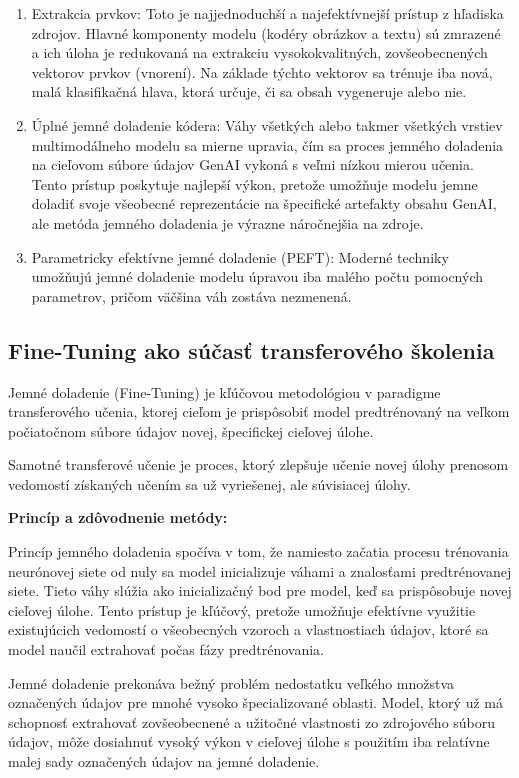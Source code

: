 \documentclass[]{tukediphc}
\begin{document}
\begin{enumerate}
    \item Extrakcia prvkov: Toto je najjednoduchší a najefektívnejší prístup z hľadiska zdrojov. Hlavné komponenty modelu (kodéry obrázkov a textu) sú zmrazené a ich úloha je redukovaná na extrakciu vysokokvalitných, zovšeobecnených vektorov prvkov (vnorení). Na základe týchto vektorov sa trénuje iba nová, malá klasifikačná hlava, ktorá určuje, či sa obsah vygeneruje alebo nie\cite{huggingface:transfer_learning}. 
    \item Úplné jemné doladenie kódera: Váhy všetkých alebo takmer všetkých vrstiev multimodálneho modelu sa mierne upravia, čím sa proces jemného doladenia na cieľovom súbore údajov GenAI vykoná s veľmi nízkou mierou učenia. Tento prístup poskytuje najlepší výkon, pretože umožňuje modelu jemne doladiť svoje všeobecné reprezentácie na špecifické artefakty obsahu GenAI, ale metóda jemného doladenia je výrazne náročnejšia na zdroje.
    \item Parametricky efektívne jemné doladenie (PEFT): Moderné techniky umožňujú jemné doladenie modelu úpravou iba malého počtu pomocných parametrov, pričom väčšina váh zostáva nezmenená.
\end{enumerate}


\subsection{Fine-Tuning ako súčasť transferového školenia}
Jemné doladenie (Fine-Tuning) je kľúčovou metodológiou v paradigme transferového učenia, ktorej cieľom je prispôsobiť model predtrénovaný na veľkom počiatočnom súbore údajov novej, špecifickej cieľovej úlohe.

Samotné transferové učenie je proces, ktorý zlepšuje učenie novej úlohy prenosom vedomostí získaných učením sa už vyriešenej, ale súvisiacej úlohy.

\textbf{Princíp a zdôvodnenie metódy:}

Princíp jemného doladenia spočíva v tom, že namiesto začatia procesu trénovania neurónovej siete od nuly sa model inicializuje váhami a znalosťami predtrénovanej siete. Tieto váhy slúžia ako inicializačný bod pre model, keď sa prispôsobuje novej cieľovej úlohe. Tento prístup je kľúčový, pretože umožňuje efektívne využitie existujúcich vedomostí o všeobecných vzoroch a vlastnostiach údajov, ktoré sa model naučil extrahovať počas fázy predtrénovania. 

Jemné doladenie prekonáva bežný problém nedostatku veľkého množstva označených údajov pre mnohé vysoko špecializované oblasti. Model, ktorý už má schopnosť extrahovať zovšeobecnené a užitočné vlastnosti zo zdrojového súboru údajov, môže dosiahnuť vysoký výkon v cieľovej úlohe s použitím iba relatívne malej sady označených údajov na jemné doladenie\cite{researchgate:fine_tuning_transfer_learning}.
\end{document}

